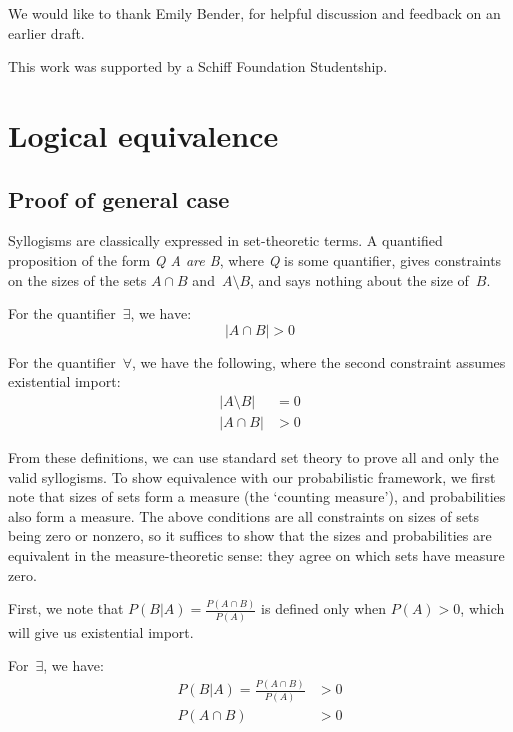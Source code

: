 \documentclass[11pt]{article}
\begin{document}
We would like to thank Emily Bender,
for helpful discussion and feedback on an earlier draft.

This work was supported by a Schiff Foundation Studentship.






\vspace*{0mm}

\appendix

\section{Logical equivalence}
\label{append:equiv}

\subsection{Proof of general case}

Syllogisms are classically expressed in set-theoretic terms.
A quantified proposition of the form \textit{Q A are B},
where \textit{Q} is some quantifier,
gives constraints on the sizes of the sets ${A\cap B}$ and~${A\setminus B}$,
and says nothing about the size of~$B$.

For the quantifier~$\exists$, we have:
\begin{equation*}
{|A \cap B | > 0}
\end{equation*}

For the quantifier~$\forall$, we have the following,
where the second constraint assumes existential import:
\begin{align*}
|A\setminus B| & = 0 \\
|A\cap B| & > 0
\end{align*}

From these definitions, we can use standard set theory
to prove all and only the valid syllogisms.
To show equivalence with our probabilistic framework,
we first note that sizes of sets form a measure (the `counting measure'),
and probabilities also form a measure.
The above conditions are all constraints on sizes of sets being zero or nonzero,
so it suffices to show that the sizes and probabilities are equivalent in the measure-theoretic sense:
they agree on which sets have measure zero.

First, we note that ${P(B|A)=\frac{P(A\cap B)}{P(A)}}$ is defined only when $P(A)>0$,
which will give us existential import.

For~$\exists$, we have:
\begin{align*}
P(B|A)=\frac{P(A\cap B)}{P(A)} & > 0 \\
P(A\cap B) & > 0
\end{align*}
\end{document}
